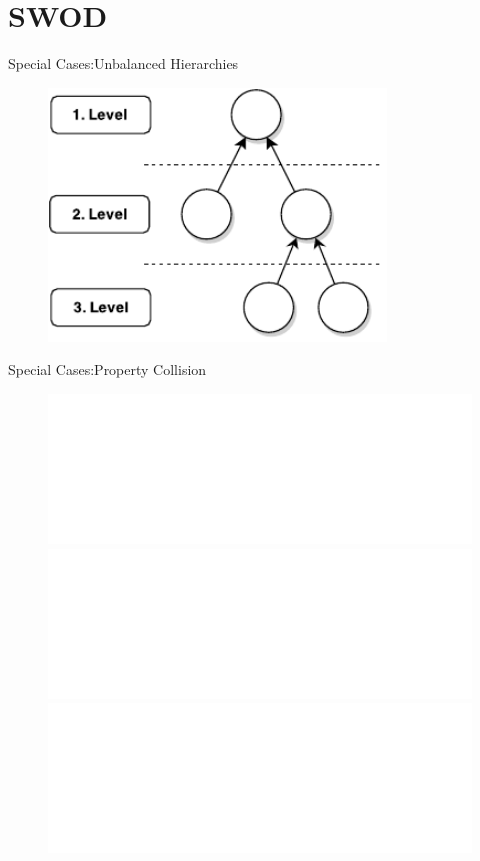 \section{SWOD}
\begin{frame}{Special Cases:}{Unbalanced Hierarchies}
\begin{figure}[tb]
    \begin{center}
        \includegraphics[width=0.8\textwidth]{images/alg-unbal-abstract-base}
    \end{center}
\end{figure}
\end{frame}


\begin{frame}{Special Cases:}{Property Collision}
    \begin{figure}
        \includegraphics<+>[trim=0 648 255 0,clip,width=1\textwidth]{images/property_collision-0.pdf}
        \includegraphics<+>[trim=0 648 255 0,clip,width=1\textwidth]{images/property_collision-1.pdf}
        \includegraphics<+>[trim=0 648 255 0,clip,width=1\textwidth]{images/property_collision-2.pdf}
    \end{figure}
\end{frame}


